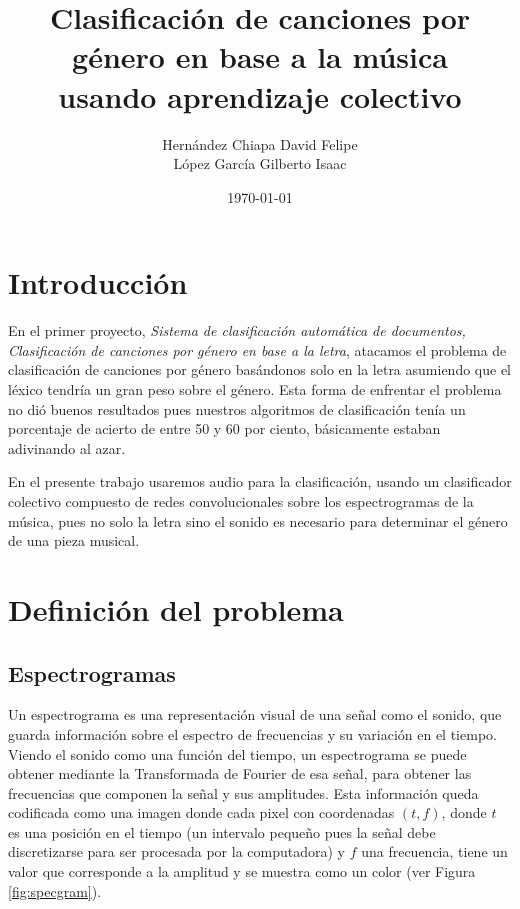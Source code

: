 \documentclass[spanish,11pt,letterpaper]{article}
\title{Clasificación de canciones por género en base a la música\\
usando aprendizaje colectivo}
\author{Hernández Chiapa David Felipe\\
López García Gilberto Isaac}
\affil{Facultad de Ciencias\\{\small Universidad Nacional Autónoma de México}}
\date{\small\today}
\begin{document}
\maketitle

\section{Introducción}

En el primer proyecto, \textit{Sistema de clasificación automática de documentos,
Clasificación de canciones por género en base a la letra}, atacamos el problema
de clasificación de canciones por género basándonos solo en la letra
asumiendo que el léxico tendría un gran peso sobre el género. Esta
forma de enfrentar el problema no dió buenos resultados pues nuestros algoritmos
de clasificación tenía un porcentaje de acierto de entre 50 y 60 por ciento,
básicamente estaban adivinando al azar.

En el presente trabajo usaremos audio para la clasificación, usando un clasificador
colectivo compuesto de redes convolucionales sobre los espectrogramas de la música,
pues no solo la letra sino el sonido es necesario para determinar el género de
una pieza musical.

\section{Definición del problema}

\subsection{Espectrogramas}

Un espectrograma es una representación visual de una señal como el sonido, que
guarda información sobre el espectro de frecuencias y su variación en el tiempo.
Viendo el sonido como una función del tiempo, un espectrograma se puede obtener
mediante la Transformada de Fourier de esa señal, para obtener las frecuencias
que componen la señal y sus amplitudes. Esta información queda codificada como una
imagen donde cada pixel con coordenadas $(t,f)$, donde $t$ es una posición en el
tiempo (un intervalo pequeño pues la señal debe discretizarse para ser procesada
por la computadora) y $f$ una frecuencia, tiene un valor que corresponde a la
amplitud y se muestra como un color (ver Figura \ref{fig:specgram}).
\end{document}
